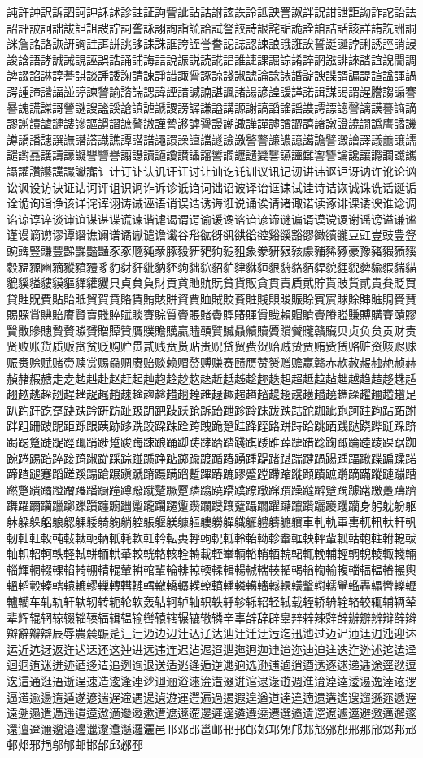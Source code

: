 訰許訲訳訴訵訶訷訸訹診註証訽訾訿詀詁詂詃詄詅詆詇詈詉詊詋詌詍詎詏詐詑詒詓詔評詖詗詘詙詚詛詜詝詞詟詠詡詢詣詤詥試詧詨詩詪詫詬詭詮詯詰話該詳詴詵詶詷詸詹詺詻詼詽詾詿誀誁誂誃誄誅誆誇誈誉誊誋誌認誎誏誐誑誒誓誔誕誖誗誘誙誚誛誜誝語誟誠誡誢誣誤誥誦誧誨誩說誫説読誮誯誰誱課誳誴誵誶誷誸誹誺誻誼誽誾調諀諁諂諃諄諅諆談諈諉諊請諌諍諎諏諐諑諒諓諔諕論諗諘諙諚諛諜諝諞諟諠諡諢諣諤諥諦諧諨諩諪諫諬諭諮諯諰諱諲諳諴諵諶諷諸諹諺諻諼諽諾諿謀謁謂謃謄謅謆謇謈謉謊謋謌謍謎謏謐謑謒謓謔謕謖謗謘謙謚講謜謝謞謟謠謡謢謣謤謥謦謧謨謩謪謫謬謭謮謯謰謱謲謳謴謵謶謷謸謹謺謻謼謽謾謿譀譁譂譃譄譅譆譇譈證譊譋譌譍譎譏譐譑譒譓譔譕譖譗識譙譚譛譜譝譞譟譠譡譢譣譤譥警譧譨譩譪譫譬譭譮譯議譱譲譳譴譵譶護譸譹譺譻譼譽譾譿讀讁讂讃讄讅讆讇讈讉變讋讌讍讎讏讐讑讒讓讔讕讖讗讘讙讚讛讜讝讞讟讠计订讣认讥讦讧讨让讪讫讬训议讯记讱讲讳讴讵讶讷许讹论讻讼讽设访诀证诂诃评诅识诇诈诉诊诋诌词诎诏诐译诒诓诔试诖诗诘诙诚诛诜话诞诟诠诡询诣诤该详诧诨诩诪诫诬语诮误诰诱诲诳说诵诶请诸诹诺读诼诽课诿谀谁谂调谄谅谆谇谈谉谊谋谌谍谎谏谐谑谒谓谔谕谖谗谘谙谚谛谜谝谞谟谠谡谢谣谤谥谦谧谨谩谪谫谬谭谮谯谰谱谲谳谴谵谶谷谸谹谺谻谼谽谾谿豀豁豂豃豄豅豆豇豈豉豊豋豌豍豎豏豐豑豒豓豔豕豖豗豘豙豚豛豜豝豞豟豠象豢豣豤豥豦豧豨豩豪豫豬豭豮豯豰豱豲豳豴豵豶豷豸豹豺豻豼豽豾豿貀貁貂貃貄貅貆貇貈貉貊貋貌貍貎貏貐貑貒貓貔貕貖貗貘貙貚貛貜貝貞貟負財貢貣貤貥貦貧貨販貪貫責貭貮貯貰貱貲貳貴貵貶買貸貹貺費貼貽貾貿賀賁賂賃賄賅賆資賈賉賊賋賌賍賎賏賐賑賒賓賔賕賖賗賘賙賚賛賜賝賞賟賠賡賢賣賤賥賦賧賨賩質賫賬賭賮賯賰賱賲賳賴賵賶賷賸賹賺賻購賽賾賿贀贁贂贃贄贅贆贇贈贉贊贋贌贍贎贏贐贑贒贓贔贕贖贗贘贙贚贛贜贝贞负贠贡财责贤败账货质贩贪贫贬购贮贯贰贱贲贳贴贵贶贷贸费贺贻贼贽贾贿赀赁赂赃资赅赆赇赈赉赊赋赌赍赎赏赐赑赒赓赔赕赖赗赘赙赚赛赜赝赞赟赠赡赢赣赤赥赦赧赨赩赪赫赬赭赮赯走赱赲赳赴赵赶起赸赹赺赻赼赽赾赿趀趁趂趃趄超趆趇趈趉越趋趌趍趎趏趐趑趒趓趔趕趖趗趘趙趚趛趜趝趞趟趠趡趢趣趤趥趦趧趨趩趪趫趬趭趮趯趰趱趲足趴趵趶趷趸趹趺趻趼趽趾趿跀跁跂跃跄跅跆跇跈跉跊跋跌跍跎跏跐跑跒跓跔跕跖跗跘跙跚跛跜距跞跟跠跡跢跣跤跥跦跧跨跩跪跫跬跭跮路跰跱跲跳跴践跶跷跸跹跺跻跼跽跾跿踀踁踂踃踄踅踆踇踈踉踊踋踌踍踎踏踐踑踒踓踔踕踖踗踘踙踚踛踜踝踞踟踠踡踢踣踤踥踦踧踨踩踪踫踬踭踮踯踰踱踲踳踴踵踶踷踸踹踺踻踼踽踾踿蹀蹁蹂蹃蹄蹅蹆蹇蹈蹉蹊蹋蹌蹍蹎蹏蹐蹑蹒蹓蹔蹕蹖蹗蹘蹙蹚蹛蹜蹝蹞蹟蹠蹡蹢蹣蹤蹥蹦蹧蹨蹩蹪蹫蹬蹭蹮蹯蹰蹱蹲蹳蹴蹵蹶蹷蹸蹹蹺蹻蹼蹽蹾蹿躀躁躂躃躄躅躆躇躈躉躊躋躌躍躎躏躐躑躒躓躔躕躖躗躘躙躚躛躜躝躞躟躠躡躢躣躤躥躦躧躨躩躪身躬躭躮躯躰躱躲躳躴躵躶躷躸躹躺躻躼躽躾躿軀軁軂軃軄軅軆軇軈軉車軋軌軍軎軏軐軑軒軓軔軕軖軗軘軙軚軛軜軝軞軟軠軡転軣軤軥軦軧軨軩軪軫軬軭軮軯軰軱軲軳軴軵軶軷軸軹軺軻軼軽軾軿輀輁輂較輄輅輆輇輈載輊輋輌輍輎輏輐輑輒輓輔輕輖輗輘輙輚輛輜輝輞輟輠輡輢輣輤輥輦輧輨輩輪輫輬輭輮輯輰輱輲輳輴輵輶輷輸輹輺輻輼輽輾輿轀轁轂轃轄轅轆轇轈轉轊轋轌轍轎轏轐轑轒轓轔轕轖轗轘轙轚轛轜轝轞轟轠轡轢轣轤轥车轧轨轩轪轫转轭轮软轰轱轲轳轴轵轶轷轸轹轺轻轼载轾轿辀辁辂较辄辅辆辇辈辉辊辋辌辍辎辏辐辑辒输辔辕辖辗辘辙辚辛辜辝辞辟辠辡辢辣辤辥辦辧辨辩辪辫辬辭辮辯辰辱農辳辴辵辶辷辸边辺辻込辽达辿迀迁迂迃迄迅迆过迈迉迊迋迌迍迎迏运近迒迓返迕迖迗还这迚进远违连迟迠迡迢迣迤迥迦迧迨迩迪迫迬迭迮迯述迱迲迳迴迵迶迷迸迹迺迻迼追迾迿退送适逃逄逅逆逇逈选逊逋逌逍逎透逐逑递逓途逕逖逗逘這通逛逜逝逞速造逡逢連逤逥逦逧逨逩逪逫逬逭逮逯逰週進逳逴逵逶逷逸逹逺逻逼逽逾逿遀遁遂遃遄遅遆遇遈遉遊運遌遍過遏遐遑遒道達違遖遗遘遙遚遛遜遝遞遟遠遡遢遣遤遥遦遧遨適遪遫遬遭遮遯遰遱遲遳遴遵遶遷選遹遺遻遼遽遾避邀邁邂邃還邅邆邇邈邉邊邋邌邍邎邏邐邑邒邓邔邕邖邗邘邙邚邛邜邝邞邟邠邡邢那邤邥邦邧邨邩邪邫邬邭邮邯邰邱邲邳